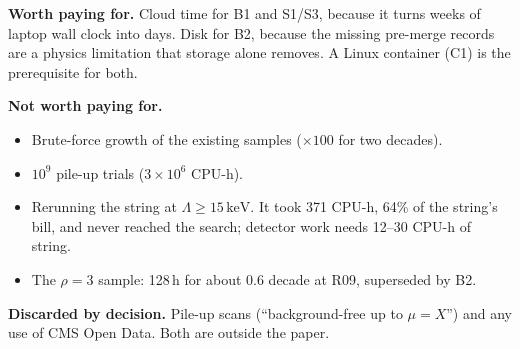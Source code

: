 \documentclass[11pt,a4paper]{article}
\newcommand{\keV}{\,\mathrm{keV}}
\begin{document}
\textbf{Worth paying for.} Cloud time for B1 and S1/S3, because it turns weeks of laptop wall clock into days. Disk for B2,
because the missing pre-merge records are a physics limitation that storage alone removes. A Linux container (C1) is the
prerequisite for both.

\textbf{Not worth paying for.}
\begin{itemize}
  \item Brute-force growth of the existing samples ($\times100$ for two decades).
  \item $10^9$ pile-up trials ($3\times10^6$ CPU-h).
  \item Rerunning the string at $\Lambda\ge15\keV$. It took 371 CPU-h, 64\% of the string's bill, and never reached the
        search; detector work needs 12--30 CPU-h of string.
  \item The $\rho=3$ sample: 128\,h for about 0.6 decade at R09, superseded by B2.
\end{itemize}

\textbf{Discarded by decision.} Pile-up scans (``background-free up to $\mu=X$'') and any use of CMS Open Data. Both are
outside the paper.

\end{document}

